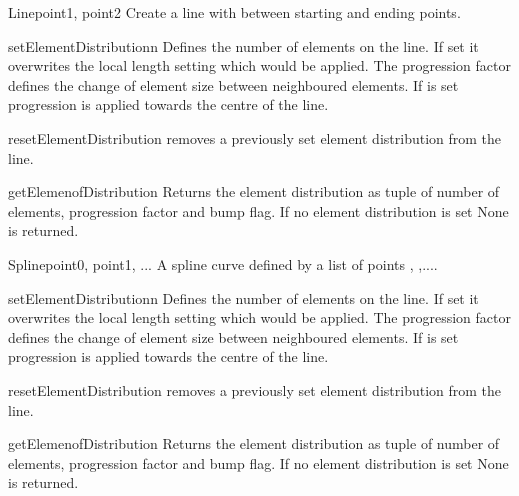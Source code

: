 \begin{classdesc}{Line}{point1, point2}
Create a line with between starting and ending points.
\end{classdesc}
\begin{methoddesc}[Line]{setElementDistribution}{n}
Defines the number of elements on the line. If set it overwrites the local length setting which would be applied. The progression factor  defines the change of element size between neighboured elements. If  is set
progression is applied towards the centre of the line.
\end{methoddesc}
\begin{methoddesc}[Line]{resetElementDistribution}{}
removes a previously set element distribution from the line.
\end{methoddesc}
\begin{methoddesc}[Line]{getElemenofDistribution}{}
Returns the element distribution as tuple of
number of elements, progression factor and bump flag. If
no element distribution is set None is returned.
\end{methoddesc}


\begin{classdesc}{Spline}{point0, point1, ...}
A spline curve defined by a list of points , ,....
\end{classdesc}
\begin{methoddesc}[Spline]{setElementDistribution}{n}
Defines the number of elements on the line. If set it overwrites the local length setting which would be applied. The progression factor  defines the change of element size between neighboured elements. If  is set
progression is applied towards the centre of the line.
\end{methoddesc}
\begin{methoddesc}[Spline]{resetElementDistribution}{}
removes a previously set element distribution from the line.
\end{methoddesc}
\begin{methoddesc}[Spline]{getElemenofDistribution}{}
Returns the element distribution as tuple of
number of elements, progression factor and bump flag. If
no element distribution is set None is returned.
\end{methoddesc}

